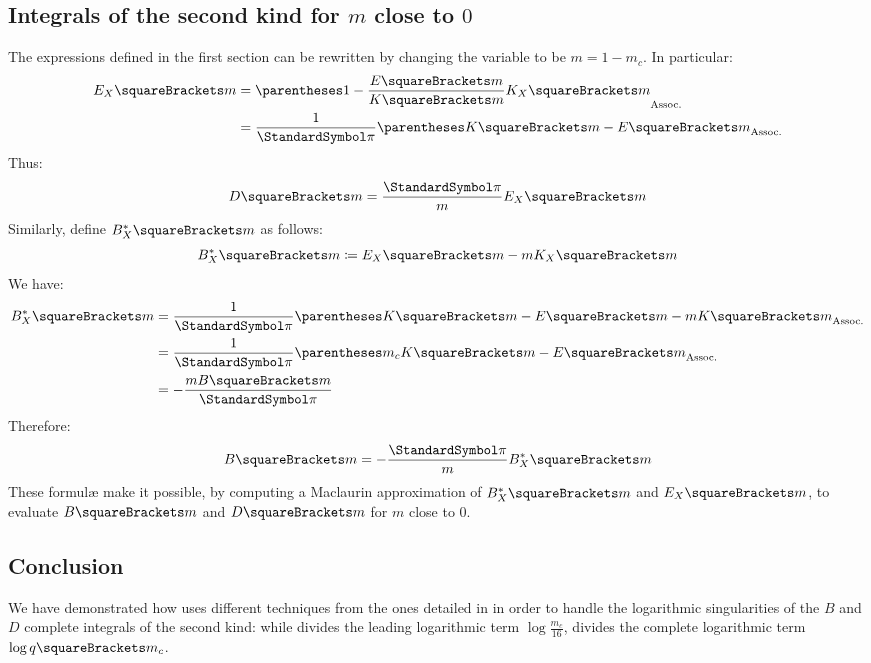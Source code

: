 \documentclass[10pt, a4paper, twoside]{basestyle}
\begin{document}
\subsection*{Integrals of the second kind for $m$ close to $0$}
The expressions defined in the first section can be rewritten by changing the variable to be $m = 1 - m_c$.  In particular:
\begin{align*}
E_X\of{m} &= \pa{1 - \frac{E\of{m}}{K\of{m}}K_X\of{m}}\\
&= \frac{1}{\Pi}\pa{K\of{m} - E\of{m}}
\end{align*}
Thus:
\[
D\of{m} = \frac{\Pi}{m}E_X\of{m}
\]
Similarly, define $B_X^*\of{m}$ as follows:
\[
B_X^*\of{m} \DefineAs E_X\of{m} - m K_X\of{m}
\]
We have:
\begin{align*}
B_X^*\of{m} &= \frac{1}{\Pi}\pa{K\of{m} - E\of{m} - m K\of{m}}\\
&= \frac{1}{\Pi}\pa{m_c K\of{m} - E\of{m}}\\
&= -\frac{m B\of{m}}{\Pi}
\end{align*}
Therefore:
\[
B\of{m} = -\frac{\Pi}{m} B_X^*\of{m}
\]
These formulæ make it possible, by computing a Maclaurin approximation of $B_X^*\of{m}$ and $E_X\of{m}$, to evaluate $B\of{m}$
and $D\of{m}$ for $m$ close to $0$.

\subsection*{Conclusion}
We have demonstrated how \cite{Fukushima2018} uses different techniques from the ones detailed in \cite{Fukushima2011a} in order to handle the 
logarithmic singularities of the $B$ and $D$ complete integrals of the second kind: while \cite{Fukushima2011a} divides the leading logarithmic term $\log \frac{m_c}{16}$, \cite{Fukushima2018} divides the complete logarithmic term $\log q\of{m_c}$.
\printbibliography[segment=0]
\begin{refsegment}
\nocite{*}
\end{refsegment}
\end{document}
